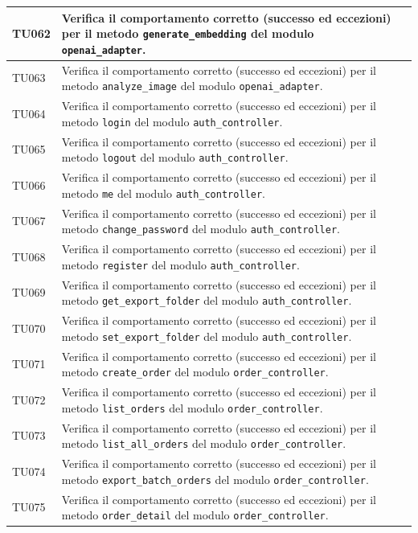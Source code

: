\documentclass[a4paper,11pt,oneside]{scrartcl}
\begin{document}
\begin{longtable}{|p{1.9cm}|p{11.6cm}|c|}
TU062 & Verifica il comportamento corretto (successo ed eccezioni) per il metodo \texttt{generate\_embedding} del modulo \texttt{openai\_adapter}. & \\ \hline
TU063 & Verifica il comportamento corretto (successo ed eccezioni) per il metodo \texttt{analyze\_image} del modulo \texttt{openai\_adapter}. & \\ \hline
TU064 & Verifica il comportamento corretto (successo ed eccezioni) per il metodo \texttt{login} del modulo \texttt{auth\_controller}. & \\ \hline
TU065 & Verifica il comportamento corretto (successo ed eccezioni) per il metodo \texttt{logout} del modulo \texttt{auth\_controller}. & \\ \hline
TU066 & Verifica il comportamento corretto (successo ed eccezioni) per il metodo \texttt{me} del modulo \texttt{auth\_controller}. & \\ \hline
TU067 & Verifica il comportamento corretto (successo ed eccezioni) per il metodo \texttt{change\_password} del modulo \texttt{auth\_controller}. & \\ \hline
TU068 & Verifica il comportamento corretto (successo ed eccezioni) per il metodo \texttt{register} del modulo \texttt{auth\_controller}. & \\ \hline
TU069 & Verifica il comportamento corretto (successo ed eccezioni) per il metodo \texttt{get\_export\_folder} del modulo \texttt{auth\_controller}. & \\ \hline
TU070 & Verifica il comportamento corretto (successo ed eccezioni) per il metodo \texttt{set\_export\_folder} del modulo \texttt{auth\_controller}. & \\ \hline
TU071 & Verifica il comportamento corretto (successo ed eccezioni) per il metodo \texttt{create\_order} del modulo \texttt{order\_controller}. & \\ \hline
TU072 & Verifica il comportamento corretto (successo ed eccezioni) per il metodo \texttt{list\_orders} del modulo \texttt{order\_controller}. & \\ \hline
TU073 & Verifica il comportamento corretto (successo ed eccezioni) per il metodo \texttt{list\_all\_orders} del modulo \texttt{order\_controller}. & \\ \hline
TU074 & Verifica il comportamento corretto (successo ed eccezioni) per il metodo \texttt{export\_batch\_orders} del modulo \texttt{order\_controller}. & \\ \hline
TU075 & Verifica il comportamento corretto (successo ed eccezioni) per il metodo \texttt{order\_detail} del modulo \texttt{order\_controller}. & \\ \hline

\end{longtable}
\end{document}

